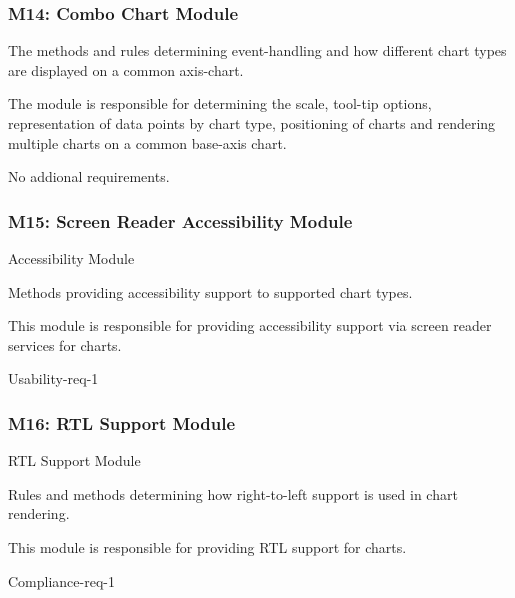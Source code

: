 \documentclass[12pt, titlepage]{article}
\begin{document}
\subsubsection{M14: Combo Chart Module}
\begin{description}[style=nextline]
\item[Secrets:] The methods and rules determining event-handling and how different chart types are displayed on a common axis-chart.
\item[Responsibilities:] The module is responsible for determining the scale, tool-tip options, representation of data points by chart type, positioning of charts and rendering multiple charts on a common base-axis chart.
\item[Requirements:] No addional requirements. 
\end{description}

\subsubsection{M15: Screen Reader Accessibility Module}
\begin{description}[style=nextline]
\item[Type:] Accessibility  Module
\item[Secrets:] Methods providing accessibility support to supported chart types.
\item[Responsibilities:] This module is responsible for providing accessibility support via screen reader services for charts. 
\item[Requirements:] Usability-req-1
\end{description}

\subsubsection{M16: RTL Support Module}
\begin{description}[style=nextline]
\item[Type:]  RTL Support Module
\item[Secrets:] Rules and methods determining how right-to-left support is used in chart rendering.
\item[Responsibilities:]  This module is responsible for providing RTL support for charts. 
\item[Requirements:] Compliance-req-1
\end{description}
\end{document}
